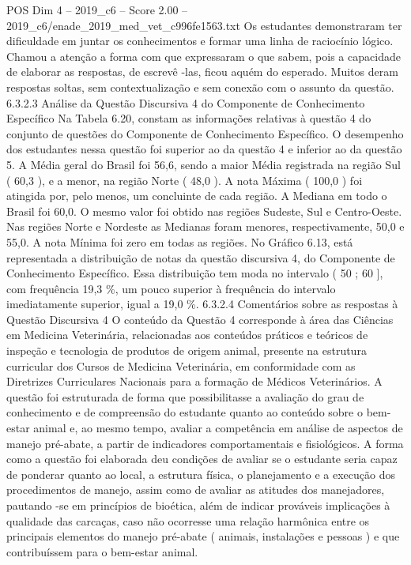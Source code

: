 \begin{textsample}{POS Dim 4 – 2019\_c6 – Score 2.00 – 2019\_c6/enade\_2019\_med\_vet\_c996fe1563.txt}
Os estudantes demonstraram ter dificuldade em juntar os conhecimentos e formar uma linha de raciocínio lógico.
Chamou a atenção a forma com que expressaram o que sabem, pois a capacidade de elaborar as respostas, de escrevê -las, ficou aquém do esperado.
Muitos deram respostas soltas, sem contextualização e sem conexão com o assunto da questão. 6.3.2.3 Análise da Questão Discursiva 4 do Componente de Conhecimento Específico Na Tabela 6.20, constam as informações relativas à questão 4 do conjunto de questões do Componente de Conhecimento Específico.
O desempenho dos estudantes nessa questão foi superior ao da questão 4 e inferior ao da questão 5.
A Média geral do Brasil foi 56,6, sendo a maior Média registrada na região Sul ( 60,3 ), e a menor, na região Norte ( 48,0 ).
A nota Máxima ( 100,0 ) foi atingida por, pelo menos, um concluinte de cada região.
A Mediana em todo o Brasil foi 60,0.
O mesmo valor foi obtido nas regiões Sudeste, Sul e Centro-Oeste.
Nas regiões Norte e Nordeste as Medianas foram menores, respectivamente, 50,0 e 55,0.
A nota Mínima foi zero em todas as regiões.
No Gráfico 6.13, está representada a distribuição de notas da questão discursiva 4, do Componente de Conhecimento Específico.
Essa distribuição tem moda no intervalo ( 50 ; 60 ], com frequência 19,3 \%, um pouco superior à frequência do intervalo imediatamente superior, igual a 19,0 \%. 6.3.2.4 Comentários sobre as respostas à Questão Discursiva 4 O conteúdo da Questão 4 corresponde à área das Ciências em Medicina Veterinária, relacionadas aos conteúdos práticos e teóricos de inspeção e tecnologia de produtos de origem animal, presente na estrutura curricular dos Cursos de Medicina Veterinária, em conformidade com as Diretrizes Curriculares Nacionais para a formação de Médicos Veterinários.
A questão foi estruturada de forma que possibilitasse a avaliação do grau de conhecimento e de compreensão do estudante quanto ao conteúdo sobre o bem-estar animal e, ao mesmo tempo, avaliar a competência em análise de aspectos de manejo pré-abate, a partir de indicadores comportamentais e fisiológicos.
A forma como a questão foi elaborada deu condições de avaliar se o estudante seria capaz de ponderar quanto ao local, a estrutura física, o planejamento e a execução dos procedimentos de manejo, assim como de avaliar as atitudes dos manejadores, pautando -se em princípios de bioética, além de indicar prováveis implicações à qualidade das carcaças, caso não ocorresse uma relação harmônica entre os principais elementos do manejo pré-abate ( animais, instalações e pessoas ) e que contribuíssem para o bem-estar animal.

\end{textsample}
